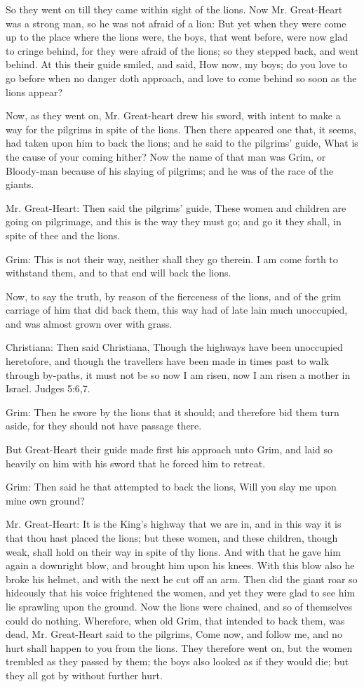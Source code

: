 So they went on till they came within sight of the lions. Now Mr. Great-Heart was a strong man, so he was not afraid of a lion: But yet when they were come up to the place where the lions were, the boys, that went before, were now glad to cringe behind, for they were afraid of the lions; so they stepped back, and went behind. At this their guide smiled, and said, How now, my boys; do you love to go before when no danger doth approach, and love to come behind so soon as the lions appear?

Now, as they went on, Mr. Great-heart drew his sword, with intent to make a way for the pilgrims in spite of the lions. Then there appeared one that, it seems, had taken upon him to back the lions; and he said to the pilgrims' guide, What is the cause of your coming hither? Now the name of that man was Grim, or Bloody-man because of his slaying of pilgrims; and he was of the race of the giants.

Mr. Great-Heart: Then said the pilgrims' guide, These women and children are going on pilgrimage, and this is the way they must go; and go it they shall, in spite of thee and the lions.

Grim: This is not their way, neither shall they go therein. I am come forth to withstand them, and to that end will back the lions.

Now, to say the truth, by reason of the fierceness of the lions, and of the grim carriage of him that did back them, this way had of late lain much unoccupied, and was almost grown over with grass.

Christiana: Then said Christiana, Though the highways have been unoccupied heretofore, and though the travellers have been made in times past to walk through by-paths, it must not be so now I am risen, now I am risen a mother in Israel. Judges 5:6,7.

Grim: Then he swore by the lions that it should; and therefore bid them turn aside, for they should not have passage there.

But Great-Heart their guide made first his approach unto Grim, and laid so heavily on him with his sword that he forced him to retreat.

Grim: Then said he that attempted to back the lions, Will you slay me upon mine own ground?

Mr. Great-Heart: It is the King's highway that we are in, and in this way it is that thou hast placed the lions; but these women, and these children, though weak, shall hold on their way in spite of thy lions. And with that he gave him again a downright blow, and brought him upon his knees. With this blow also he broke his helmet, and with the next he cut off an arm. Then did the giant roar so hideously that his voice frightened the women, and yet they were glad to see him lie sprawling upon the ground. Now the lions were chained, and so of themselves could do nothing. Wherefore, when old Grim, that intended to back them, was dead, Mr. Great-Heart said to the pilgrims, Come now, and follow me, and no hurt shall happen to you from the lions. They therefore went on, but the women trembled as they passed by them; the boys also looked as if they would die; but they all got by without further hurt.

